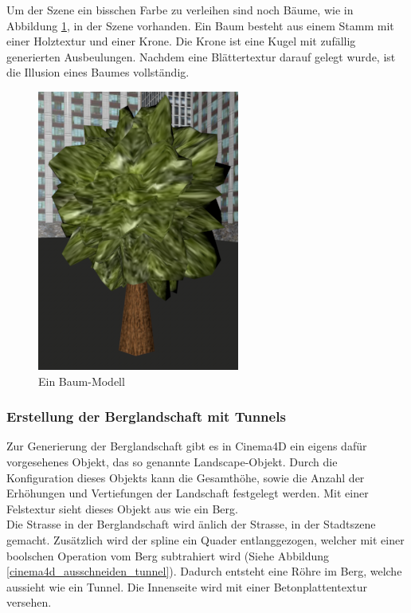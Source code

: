 Um der Szene ein bisschen Farbe zu verleihen sind noch Bäume, wie in Abbildung \ref{screenshot_tree}, in der Szene vorhanden. Ein Baum besteht aus einem Stamm mit einer Holztextur und einer Krone. Die Krone ist eine Kugel mit zufällig generierten Ausbeulungen. Nachdem eine Blättertextur darauf gelegt wurde, ist die Illusion eines Baumes vollständig.\\

\begin{figure}[H]
\centering 
\includegraphics[scale=0.4]{src/screenshot_tree.png}
\caption{Ein Baum-Modell} %
\label{screenshot_tree} %
\end{figure}

\subsubsection{Erstellung der Berglandschaft mit Tunnels}
Zur Generierung der Berglandschaft gibt es in Cinema4D ein eigens dafür vorgesehenes Objekt, das so genannte Landscape-Objekt. Durch die Konfiguration dieses Objekts kann die Gesamthöhe, sowie die Anzahl der Erhöhungen und Vertiefungen der Landschaft festgelegt werden. Mit einer Felstextur sieht dieses Objekt aus wie ein Berg.\\
Die Strasse in der Berglandschaft wird änlich der Strasse, in der Stadtszene gemacht. Zusätzlich wird der \gls{spline} ein Quader entlanggezogen, welcher mit einer boolschen Operation vom Berg subtrahiert wird (Siehe Abbildung \ref{cinema4d_ausschneiden_tunnel}). Dadurch entsteht eine Röhre im Berg, welche aussieht wie ein Tunnel. Die Innenseite wird mit einer Betonplattentextur versehen.

